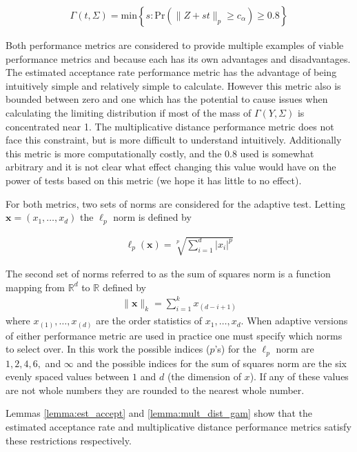 \documentclass{article}
\begin{document}
\begin{align}
	\Gamma(t, \Sigma) = \text{min}\left\{s : \text{Pr}(\|Z + st\|_p \geq c_\alpha) \geq 0.8 \right\} \label{eqn:mult_dist_gam}
\end{align}

Both performance metrics are considered to provide multiple examples of viable performance metrics and because each has its own advantages and disadvantages.  The estimated acceptance rate performance metric has the advantage of being intuitively simple and relatively simple to calculate.  However this metric also is bounded between zero and one which has the potential to cause issues when calculating the limiting distribution if most of the mass of $\Gamma(Y, \Sigma)$ is concentrated near 1.  The multiplicative distance performance metric does not face this constraint, but is more difficult to understand intuitively.  Additionally this metric is more computationally costly, and the $0.8$ used is somewhat arbitrary and it is not clear what effect changing this value would have on the power of tests based on this metric (we hope it has little to no effect).

For both metrics, two sets of norms are considered for the adaptive test.  Letting $\boldsymbol{x} = \left(x_1, \dots, x_d\right)$ the $\ell_p$ norm is defined by

\begin{align*}
 \ell_p(\boldsymbol{x}) = \sqrt[p]{\sum_{i = 1}^d |x_i|^p }
\end{align*}

The second set of norms referred to as the sum of squares norm is a function mapping from $\mathbb{R}^d$ to $\mathbb{R}$ defined by 
\begin{align*}
	\|\boldsymbol{x}\|_k = \sum_{i = 1}^k x_{(d - i + 1)} 
\end{align*}
where $x_{(1)}, \dots, x_{(d)}$ are the order statistics of $x_1, \dots, x_d$. When adaptive versions of either performance metric are used in practice one must specify which norms to select over.  In this work the possible indices ($p$'s) for the $\ell_p$ norm are $1, 2, 4, 6,$ and $\infty$ and the possible indices for the sum of squares norm are the six evenly spaced values between $1$ and $d$ (the dimension of $x$).  If any of these values are not whole numbers they are rounded to the nearest whole number.  

Lemmas \ref{lemma:est_accept} and \ref{lemma:mult_dist_gam} show that the estimated acceptance rate and multiplicative distance performance metrics satisfy these restrictions respectively.  
\end{document}
